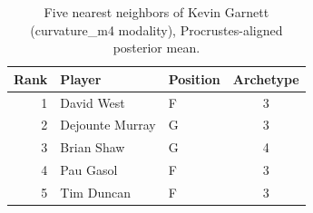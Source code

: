 \begin{table}[htbp]
  \centering\small
  \begin{tabular}{rllc}
    \toprule
    Rank & Player & Position & Archetype \\
    \midrule
    1 & David West & F & 3 \\
    2 & Dejounte Murray & G & 3 \\
    3 & Brian Shaw & G & 4 \\
    4 & Pau Gasol & F & 3 \\
    5 & Tim Duncan & F & 3 \\
    \bottomrule
  \end{tabular}
  \caption{Five nearest neighbors of Kevin Garnett (curvature_m4 modality), Procrustes-aligned posterior mean.}
  \label{tab:Kevin_Garnett_neighbors_curvature_m4}
\end{table}

